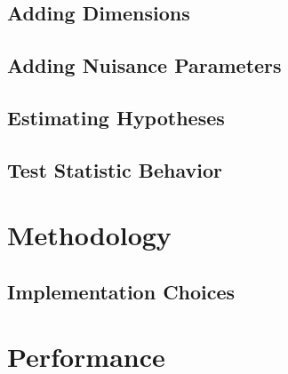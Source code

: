 \documentclass[%
preprint, linenumbers,
groupedaddress,
amsmath,amssymb,
aps, physrev,
]{revtex4-2}
\begin{document}
\subsection{Adding Dimensions}

\subsection{Adding Nuisance Parameters}



\subsection{Estimating Hypotheses}



\subsection{Test Statistic Behavior}




\section{Methodology}
\subsection{Implementation Choices}





\section{Performance}





\end{document}

